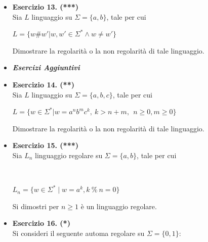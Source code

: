 \documentclass[a4paper,10pt]{article}
\begin{document}
{\begin{itemize}[label=, leftmargin=0pt]
    \item \textbf{Esercizio 13. (***)}\\ Sia $L$ linguaggio su $\Sigma=\{a,b\}$, tale per cui 
    {\begin{center}
        $L = \{ w\#w' | w,w'\in \Sigma^* \land w \neq w'\}$
    \end{center}} 
    Dimostrare la regolarità o la non regolarità di tale linguaggio.\\[1.2cm]

    
    \item \textit{\textbf{Esercizi Aggiuntivi}}

\item \textbf{Esercizio 14. (**)}\\ Sia $L$ linguaggio su $\Sigma=\{a,b,c\}$, tale per cui 
    {\begin{center}
        $L = \{ w\in \Sigma^* | w=a^nb^mc^k, \ k>n+m, \ \ n\geq 0, m\geq 0\}$
    \end{center}} 
    Dimostrare la regolarità o la non regolarità di tale linguaggio.\\[0.1cm]

    
    \item \textbf{Esercizio 15. (***)}\\ Sia $L_n$ linguaggio regolare su $\Sigma=\{a,b\}$, tale per cui 
    {\\ \begin{center}
        $L_n = \{ w \in \Sigma^* \mid w = a^k, k\ \%\ n=0\}$
    \end{center}} 
    Si dimostri per $n\geq 1$ è un linguaggio regolare.\\[0.1cm]

    
    \item \textbf{Esercizio 16. (*)}\\
    Si consideri il seguente automa regolare su $\Sigma = \{0,1\}$:
    {
    \small
    \begin{center}
\end{center}}
\end{itemize}}
\end{document}
